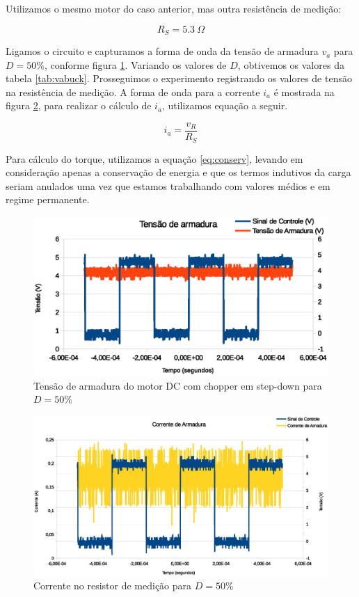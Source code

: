 \documentclass{article}
\begin{document}
Utilizamos o mesmo motor do caso anterior, mas outra resistência de medição:

\begin{equation}
R_S=5.3\ \Omega
\end{equation}

Ligamos o circuito e capturamos a forma de onda da tensão de armadura $v_a$ para $D=50\%$, conforme figura \ref{fig:vabuck}. Variando os valores de $D$, obtivemos os valores da tabela \ref{tab:vabuck}. Prosseguimos o experimento registrando os valores de tensão na resistência de medição. A forma de onda para a corrente $i_a$ é mostrada na figura \ref{fig:iabuck}, para realizar o cálculo de $i_a$, utilizamos equação a seguir.

\begin{equation}
i_a=\frac{v_R}{R_S}
\end{equation}

Para cálculo do torque, utilizamos a equação \ref{eq:conserv}, levando em consideração apenas a conservação de energia e que os termos indutivos da carga seriam anulados uma vez que estamos trabalhando com valores médios e em regime permanente.

\begin{figure}[H]
	\centering
	\includegraphics[width=\linewidth]{Dados/Buck/va}
	\caption{Tensão de armadura do motor DC com chopper em step-down para $D=50\%$}
	\label{fig:vabuck}
\end{figure}

\begin{figure}[H]
	\centering
	\includegraphics[width=\linewidth]{Dados/Buck/ia}
	\caption{Corrente no resistor de medição para $D=50\%$}
	\label{fig:iabuck}
\end{figure}
\end{document}
